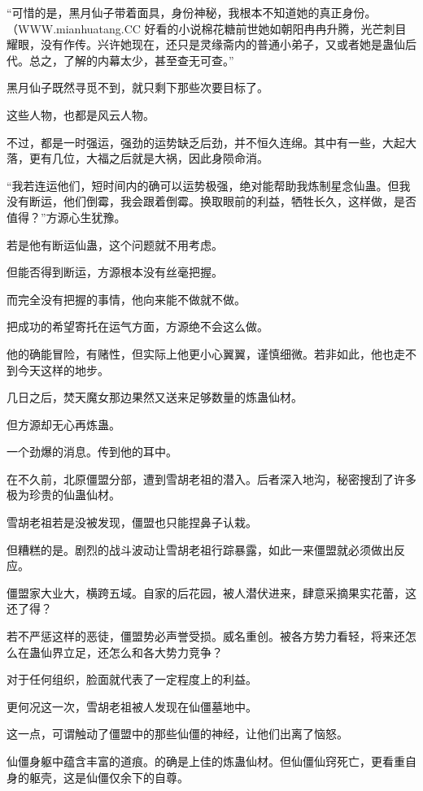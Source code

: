 
\begin{this_body}

“可惜的是，黑月仙子带着面具，身份神秘，我根本不知道她的真正身份。（WWW.mianhuatang.CC 好看的小说棉花糖前世她如朝阳冉冉升腾，光芒刺目耀眼，没有作传。兴许她现在，还只是灵缘斋内的普通小弟子，又或者她是蛊仙后代。总之，了解的内幕太少，甚至查无可查。”

黑月仙子既然寻觅不到，就只剩下那些次要目标了。

这些人物，也都是风云人物。

不过，都是一时强运，强劲的运势缺乏后劲，并不恒久连绵。其中有一些，大起大落，更有几位，大福之后就是大祸，因此身陨命消。

“我若连运他们，短时间内的确可以运势极强，绝对能帮助我炼制星念仙蛊。但我没有断运，他们倒霉，我会跟着倒霉。换取眼前的利益，牺牲长久，这样做，是否值得？”方源心生犹豫。

若是他有断运仙蛊，这个问题就不用考虑。

但能否得到断运，方源根本没有丝毫把握。

而完全没有把握的事情，他向来能不做就不做。

把成功的希望寄托在运气方面，方源绝不会这么做。

他的确能冒险，有赌性，但实际上他更小心翼翼，谨慎细微。若非如此，他也走不到今天这样的地步。

几日之后，焚天魔女那边果然又送来足够数量的炼蛊仙材。

但方源却无心再炼蛊。

一个劲爆的消息。传到他的耳中。

在不久前，北原僵盟分部，遭到雪胡老祖的潜入。后者深入地沟，秘密搜刮了许多极为珍贵的仙蛊仙材。

雪胡老祖若是没被发现，僵盟也只能捏鼻子认栽。

但糟糕的是。剧烈的战斗波动让雪胡老祖行踪暴露，如此一来僵盟就必须做出反应。

僵盟家大业大，横跨五域。自家的后花园，被人潜伏进来，肆意采摘果实花蕾，这还了得？

若不严惩这样的恶徒，僵盟势必声誉受损。威名重创。被各方势力看轻，将来还怎么在蛊仙界立足，还怎么和各大势力竞争？

对于任何组织，脸面就代表了一定程度上的利益。

更何况这一次，雪胡老祖被人发现在仙僵墓地中。

这一点，可谓触动了僵盟中的那些仙僵的神经，让他们出离了恼怒。

仙僵身躯中蕴含丰富的道痕。的确是上佳的炼蛊仙材。但仙僵仙窍死亡，更看重自身的躯壳，这是仙僵仅余下的自尊。


\end{this_body}
